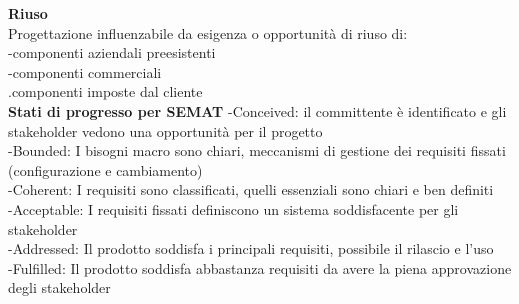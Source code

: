 \documentclass{article}
\begin{document}
		\textbf{Riuso}\\
		Progettazione influenzabile da esigenza o opportunità di riuso di:\\
		-componenti aziendali preesistenti\\
		-componenti commerciali\\
		.componenti imposte dal cliente\\
		
		\textbf{Stati di progresso per SEMAT} 
		-Conceived: il committente è identificato e gli stakeholder vedono una opportunità per il progetto\\
		-Bounded: I bisogni macro sono chiari, meccanismi di gestione dei requisiti fissati (configurazione e cambiamento)\\
		-Coherent: I requisiti sono classificati, quelli essenziali sono chiari e ben definiti\\
		-Acceptable: I requisiti fissati definiscono un sistema soddisfacente per gli stakeholder\\
		-Addressed: Il prodotto soddisfa i principali requisiti, possibile il rilascio e l'uso\\
		-Fulfilled: Il prodotto soddisfa abbastanza requisiti da avere la piena approvazione degli stakeholder\\
		
		
		
\end{document}
